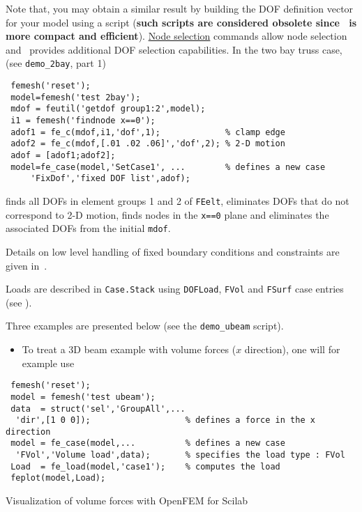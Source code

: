 Note that, you may obtain a similar result by building the DOF definition vector for your model using a script ({\bf such scripts are considered obsolete since \fecase\ is more compact and efficient}). \hyperlink{findnode}{Node selection} commands allow node selection and \fec\ provides additional DOF selection capabilities. In the two bay truss case, (see {\tt demo\_2bay}, part 1)
%
\begin{verbatim}
 femesh('reset');
 model=femesh('test 2bay');
 mdof = feutil('getdof group1:2',model);
 i1 = femesh('findnode x==0');
 adof1 = fe_c(mdof,i1,'dof',1);             % clamp edge
 adof2 = fe_c(mdof,[.01 .02 .06]','dof',2); % 2-D motion
 adof = [adof1;adof2];
 model=fe_case(model,'SetCase1', ...        % defines a new case
     'FixDof','fixed DOF list',adof);  
\end{verbatim}
%
finds all DOFs in element groups 1 and 2 of {\tt FEelt}, eliminates DOFs that do not correspond to 2-D motion, finds nodes in the {\tt x==0} plane and eliminates the associated DOFs from the initial {\tt mdof}.

Details on low level handling of fixed boundary conditions and constraints are given in~.

\newpage
Loads  are described in {\tt Case.Stack} using {\tt DOFLoad}, {\tt FVol} and {\tt FSurf} case entries (see \fecase).

Three examples are presented below (see the {\tt demo\_ubeam} script).

\begin{itemize}
\item To treat a 3D beam example with volume forces ($x$ direction), one will for example use
\end{itemize}
\vspace{-0.5cm}
\begin{verbatim}
 femesh('reset');
 model = femesh('test ubeam');
 data  = struct('sel','GroupAll',...
  'dir',[1 0 0]);                   % defines a force in the x direction
 model = fe_case(model,...          % defines a new case
  'FVol','Volume load',data);       % specifies the load type : FVol
 Load  = fe_load(model,'case1');    % computes the load
 feplot(model,Load);

\end{verbatim}

\begin{center}
\begin{figure}[H]
\centering
{}
\end{figure}

Visualization of volume forces with OpenFEM for Scilab
\end{center}

